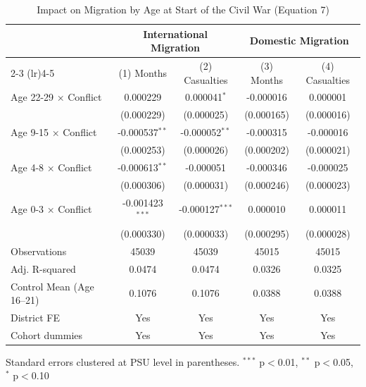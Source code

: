 \begin{table}[htbp]
\centering
\footnotesize
\caption{Impact on Migration by Age at Start of the Civil War (Equation 7)}
\label{tab:did_phadera}
\begin{tabular}{l cccc}
\toprule
 & \multicolumn{2}{c}{International Migration} & \multicolumn{2}{c}{Domestic Migration} \\
\cmidrule(lr){2-3} \cmidrule(lr){4-5}
 & (1) Months & (2) Casualties & (3) Months & (4) Casualties \\
\midrule
\quad Age 22-29 × Conflict & 0.000229 & 0.000041$^{*}$ & -0.000016 & 0.000001 \\
 & (0.000229) & (0.000025) & (0.000165) & (0.000016) \\
\quad Age 9-15 × Conflict & -0.000537$^{**}$ & -0.000052$^{**}$ & -0.000315 & -0.000016 \\
 & (0.000253) & (0.000026) & (0.000202) & (0.000021) \\
\quad Age 4-8 × Conflict & -0.000613$^{**}$ & -0.000051 & -0.000346 & -0.000025 \\
 & (0.000306) & (0.000031) & (0.000246) & (0.000023) \\
\quad Age 0-3 × Conflict & -0.001423$^{***}$ & -0.000127$^{***}$ & 0.000010 & 0.000011 \\
 & (0.000330) & (0.000033) & (0.000295) & (0.000028) \\
\midrule
Observations & 45039 & 45039 & 45015 & 45015 \\
Adj. R-squared & 0.0474 & 0.0474 & 0.0326 & 0.0325 \\
Control Mean (Age 16--21) & 0.1076 & 0.1076 & 0.0388 & 0.0388 \\
District FE & Yes & Yes & Yes & Yes \\
Cohort dummies & Yes & Yes & Yes & Yes \\
\bottomrule
\end{tabular}
\begin{tablenotes}
\footnotesize
\item Standard errors clustered at PSU level in parentheses. $^{***}$ p$<$0.01, $^{**}$ p$<$0.05, $^{*}$ p$<$0.10
\end{tablenotes}
\end{table}

\clearpage

